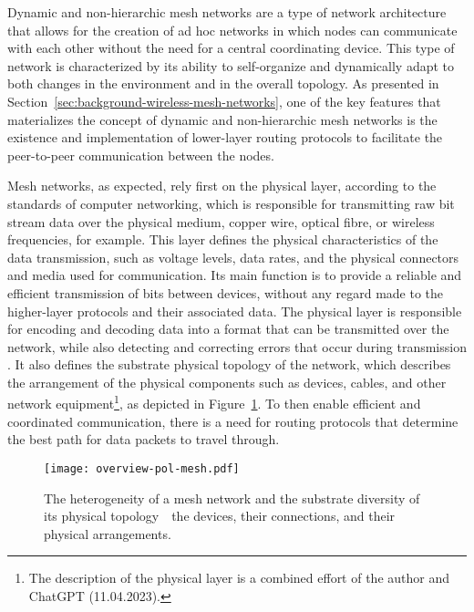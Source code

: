 Dynamic and non-hierarchic mesh networks are a type of network architecture that allows for the creation of ad hoc networks in which nodes can communicate with each other without the need for a central coordinating device. This type of network is characterized by its ability to self-organize and dynamically adapt to both changes in the environment and in the overall topology. As presented in Section~\ref{sec:background-wireless-mesh-networks}, one of the key features that materializes the concept of dynamic and non-hierarchic mesh networks is the existence and implementation of lower-layer routing protocols to facilitate the peer-to-peer communication between the nodes.

Mesh networks, as expected, rely first on the physical layer, according to the standards of computer networking, which is responsible for transmitting raw bit stream data over the physical medium, copper wire, optical fibre, or wireless frequencies, for example. This layer defines the physical characteristics of the data transmission, such as voltage levels, data rates, and the physical connectors and media used for communication. Its main function is to provide a reliable and efficient transmission of bits between devices, without any regard made to the higher-layer protocols and their associated data. The physical layer is responsible for encoding and decoding data into a format that can be transmitted over the network, while also detecting and correcting errors that occur during transmission \cite{peterson2007computer}. It also defines the substrate physical topology of the network, which describes the arrangement of the physical components such as devices, cables, and other network equipment\footnote{The description of the physical layer is a combined effort of the author and ChatGPT (11.04.2023).}, as depicted in Figure~\ref{fig:proof-of-location-overview-pol-mesh}. To then enable efficient and coordinated communication, there is a need for routing protocols that determine the best path for data packets to travel through.

\begin{figure}[h!]
    \begin{center}
    \texttt{[image: overview-pol-mesh.pdf]}
    \caption{The heterogeneity of a mesh network and the substrate diversity of its physical topology~\textemdash~the devices, their connections, and their physical arrangements.}
    \label{fig:proof-of-location-overview-pol-mesh}
    \end{center}
\end{figure}

